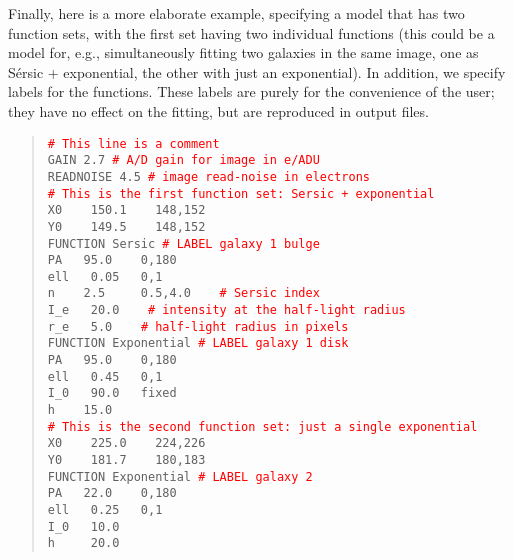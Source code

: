 \documentclass[10pt,a4paper,article]{memoir}
\newcommand{\red}{\textcolor{red}}
\begin{document}
Finally, here is a more elaborate example, specifying a model that has two
function sets, with the first set having two individual functions (this
could be a model for, e.g., simultaneously fitting two galaxies in the same
image, one as S\'ersic + exponential, the other with just an exponential).
In addition, we specify labels for the functions. These labels are
purely for the convenience of the user; they have no
effect on the fitting, but are reproduced in output files.

\begin{quote}
  \texttt{\red{\# This line is a comment}}\\
  
  \texttt{GAIN  2.7   \red{\# A/D gain for image in e/ADU}}\\
  \texttt{READNOISE  4.5   \red{\# image read-noise in electrons}}\\
  
  \texttt{\red{\# This is the first function set: Sersic + exponential}}\\
  \texttt{X0 ~~   150.1  ~~ 148,152}\\
  \texttt{Y0 ~~   149.5  ~~ 148,152}\\
  \texttt{FUNCTION   Sersic   \red{\# LABEL galaxy 1 bulge}}\\
  \texttt{PA  ~  95.0  ~~ 0,180}\\
  \texttt{ell ~   0.05 ~ 0,1}\\
  \texttt{n   ~~   2.5  ~~~ 0.5,4.0 ~~ \red{\# Sersic index}}\\
  \texttt{I\_e ~  20.0 ~~ \red{\# intensity at the half-light radius}}\\
  \texttt{r\_e ~    5.0 ~~ \red{\# half-light radius in pixels}}\\
  \texttt{FUNCTION   Exponential   \red{\# LABEL galaxy 1 disk}}\\
  \texttt{PA   ~ 95.0  ~~ 0,180}\\
  \texttt{ell  ~  0.45  ~~0,1}\\
  \texttt{I\_0 ~  90.0  ~ fixed}\\
  \texttt{h    ~~ 15.0}\\
  
  \texttt{\red{\# This is the second function set: just a single exponential}}\\
  \texttt{X0 ~~   225.0  ~~ 224,226}\\
  \texttt{Y0 ~~   181.7  ~~ 180,183}\\
  \texttt{FUNCTION   Exponential   \red{\# LABEL galaxy 2}} \\
  \texttt{PA   ~ 22.0  ~~ 0,180      }\\
  \texttt{ell  ~  0.25 ~ 0,1}\\
  \texttt{I\_0 ~  10.0  }\\
  \texttt{h   ~~~  20.0}\\
\end{quote}
\end{document}
